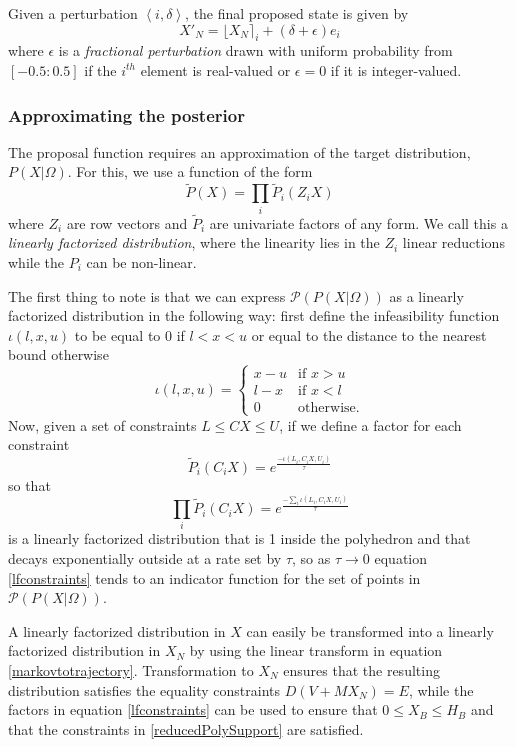 \documentclass{article}
\begin{document}
Given a perturbation $\left<i,\delta\right>$, the final proposed state is given by
\[
X'_N = \lfloor X_N \rceil_i + (\delta + \epsilon)e_i
\]
where $\epsilon$ is a \textit{fractional perturbation} drawn with uniform probability from $[-0.5:0.5]$ if the $i^{th}$ element is real-valued or $\epsilon = 0$ if it is integer-valued.

\subsubsection{Approximating the posterior}
\label{approximatingThePosterior}
The proposal function requires an approximation of the target distribution, $P(X|\Omega)$. For this, we use a function of the form
\begin{equation}
\tilde{P}(X) = \prod_i \tilde{P}_i(Z_iX)
\end{equation}
where $Z_i$ are row vectors and $\tilde{P}_i$ are univariate factors of any form. We call this a \textit{linearly factorized distribution}, where the linearity lies in the $Z_i$ linear reductions  while the $P_i$ can be non-linear.

The first thing to note is that we can express $\mathcal{P}(P(X|\Omega))$ as a linearly factorized distribution in the following way: first define the infeasibility function $\iota(l,x,u)$ to be equal to 0 if $l < x < u$ or equal to the distance to the nearest bound otherwise
\[
\iota(l,x,u) =
\begin{cases}
x-u & \text{if }x>u\\
l-x & \text{if }x<l\\
0 & \text{otherwise.}
\end{cases}
\]
Now, given a set of constraints $L \le CX \le U$, if we define a factor for each constraint
\begin{equation}
\tilde{P}_i(C_iX) = e^{\frac{-\iota(L_i,C_iX,U_i)}{\tau}}
\end{equation}
so that
\begin{equation}
\prod_i \tilde{P}_i(C_iX) = e^{\frac{-\sum_i \iota(L_i,C_iX,U_i)}{\tau}}
\label{lfconstraints}
\end{equation}
is a linearly factorized distribution that is 1 inside the polyhedron and that decays exponentially outside at a rate set by $\tau$, so as $\tau \to 0$ equation \eqref{lfconstraints} tends to an indicator function for the set of points in $\mathcal{P}(P(X|\Omega))$.

A linearly factorized distribution in $X$ can easily be transformed into a linearly factorized distribution in $X_N$ by using the linear transform in equation \eqref{markovtotrajectory}. Transformation to $X_N$ ensures that the resulting distribution satisfies the equality constraints $D(V+MX_N)=E$, while the factors in equation \eqref{lfconstraints} can be used to ensure that $0 \le X_B \le H_B$ and that the constraints in \eqref{reducedPolySupport} are satisfied.
\end{document}
